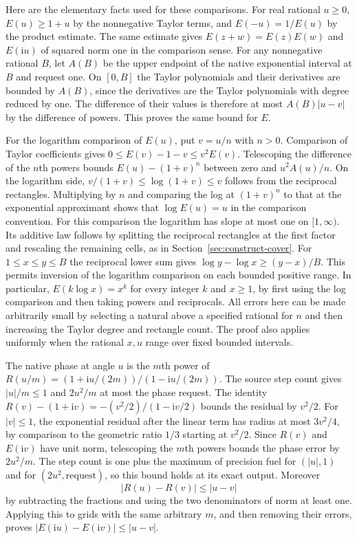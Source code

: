 \documentclass[11pt]{amsart}
\theoremstyle{definition}
\theoremstyle{remark}
\numberwithin{equation}{section}
\begin{document}
Here are the elementary facts used for these comparisons. For real
rational \(u\ge0\), \(E(u)\ge1+u\) by the nonnegative Taylor terms,
and \(E(-u)=1/E(u)\) by the product estimate. The same estimate gives
\(E(z+w)=E(z)E(w)\) and \(E(\mathrm i u)\) of squared norm one in
the comparison sense. For any nonnegative rational \(B\), let \(A(B)\)
be the upper endpoint of the native exponential interval at \(B\)
and request one. On \([0,B]\) the Taylor polynomials and their
derivatives are bounded by \(A(B)\), since the derivatives are the
Taylor polynomials with degree reduced by one. The difference
of their values is therefore at most \(A(B)|u-v|\) by
the difference of powers. This proves the same bound for \(E\).

For the logarithm comparison of \(E(u)\), put \(v=u/n\) with \(n>0\).
Comparison of Taylor coefficients gives
\(0\le E(v)-1-v\le v^2E(v)\).
Telescoping the difference of the \(n\)th powers bounds
\(E(u)-(1+v)^n\) between zero and \(u^2 A(u)/n\).
On the logarithm side, \(v/(1+v)\le\log(1+v)\le v\) follows from
the reciprocal rectangles. Multiplying by \(n\) and comparing the log
at \((1+v)^n\) to that at the exponential approximant shows that
\(\log E(u)=u\) in the comparison convention.
For this comparison the logarithm has slope at most one on
\([1,\infty)\). Its additive law follows by splitting the reciprocal
rectangles at the first factor and rescaling the remaining cells, as
in Section~\ref{sec:construct-cover}. For \(1\le x\le y\le B\)
the reciprocal lower sum gives
\(\log y-\log x\ge(y-x)/B\). This permits inversion of the logarithm
comparison on each bounded positive range. In particular,
\(E(k\log x)=x^k\) for every integer \(k\) and \(x\ge1\), by first
using the log comparison and then taking powers and reciprocals.
All errors here can be made arbitrarily small by selecting a natural
above a specified rational for \(n\) and then increasing the Taylor
degree and rectangle count. The proof also applies uniformly when
the rational \(x,u\) range over fixed bounded intervals.

The native phase at angle \(u\) is the \(m\)th power of
\(R(u/m)=(1+\mathrm i u/(2m))/(1-\mathrm i u/(2m))\).
The source step count gives \(|u|/m\le1\) and \(2u^2/m\) at most
the phase request. The identity \(R(v)-(1+\mathrm i v)
=-(v^2/2)/(1-\mathrm i v/2)\) bounds the residual by \(v^2/2\).
For \(|v|\le1\), the exponential residual after the linear term has
radius at most \(3v^2/4\), by comparison to the geometric ratio
\(1/3\) starting at \(v^2/2\). Since \(R(v)\) and \(E(\mathrm i v)\)
have unit norm, telescoping the \(m\)th powers bounds the phase error
by \(2u^2/m\). The step count is one plus the maximum of precision
fuel for \((|u|,1)\) and for \((2u^2,\text{request})\), so this bound
holds at its exact output. Moreover
\[
 |R(u)-R(v)|\le |u-v|
\]
by subtracting the fractions and using the two denominators of norm
at least one. Applying this to grids with the same arbitrary \(m\),
and then removing their errors, proves
\(|E(\mathrm i u)-E(\mathrm i v)|\le|u-v|\).
\end{document}
